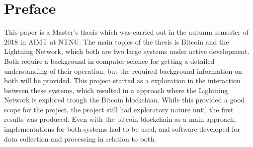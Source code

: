 \hypersetup{pageanchor=false}
%

\chapter*{Preface}
This paper is a Master's thesis which was carried out in the autumn semester of 2018 in AIMT at NTNU. The main topics of the thesis is Bitcoin and the Lightning Network, which both are two large systems under active development. Both require a background in computer science for getting a detailed understanding of their operation, but the required background information on both will be provided. This project started as a exploration in the interaction between these systems, which resulted in a approach where the Lightning Network is explored trough the Bitcoin blockchian. While this provided a good scope for the project, the project still had exploratory nature until the first results was produced. 
Even with the bitcoin blockchain as a main approach, implementations for both systems had to be used, and software developed for data collection and processing in relation to both.

\thesisdate \\[1pc]
\\[1pc]
